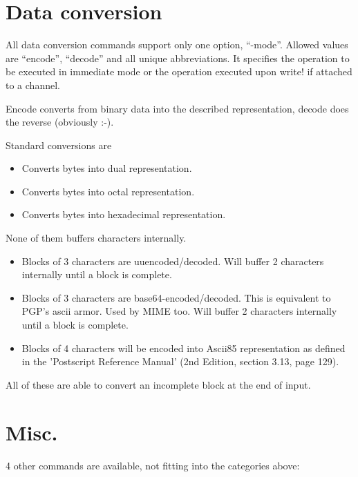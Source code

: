 \section {Data conversion}

All data conversion commands support only one option, ``-mode''.
Allowed values are ``encode'', ``decode'' and all unique
abbreviations. It specifies the operation to be executed in immediate
mode or the operation executed upon write! if attached to a channel.

Encode converts from binary data into the described representation,
decode does the reverse (obviously :-).

Standard conversions are
\begin {itemize}
\item[bin]	Converts bytes into dual representation.
\item[oct]	Converts bytes into octal representation.
\item[hex]	Converts bytes into hexadecimal representation.
\end   {itemize}
None of them buffers characters internally.

\begin {itemize}
\item[uuencode]	Blocks of 3 characters are uuencoded/decoded. Will
		buffer 2 characters internally until a block is complete.
\item[base64]	Blocks of 3 characters are
		base64-encoded/decoded. This is equivalent to PGP's
		ascii armor. Used by MIME too. Will buffer 2
		characters internally until a block is complete.
\item[ascii85]	Blocks of 4 characters will be encoded into Ascii85
		representation as defined in the 'Postscript Reference
		Manual' (2nd Edition, section 3.13, page 129).
\end   {itemize}
All of these are able to convert an incomplete block at the end of
input.

\section {Misc.}

4 other commands are available, not fitting into the categories above:


